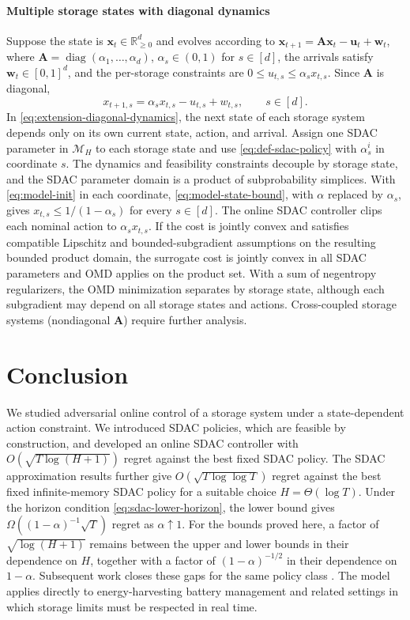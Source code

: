 \documentclass[journal]{IEEEtran}
\theoremstyle{remark}
\begin{document}
\paragraph{Multiple storage states with diagonal dynamics}
Suppose the state is $\mathbf{x}_t\in\mathbb{R}_{\ge0}^d$ and evolves according to
$\mathbf{x}_{t+1}=\mathbf{A}\mathbf{x}_t-\mathbf{u}_t+\mathbf{w}_t$, where
$\mathbf{A}=\operatorname{diag}(\alpha_1,\ldots,\alpha_d)$,
$\alpha_s\in(0,1)$ for $s\in[d]$, the arrivals satisfy
$\mathbf{w}_t\in[0,1]^d$, and the per-storage constraints are
$0\le u_{t,s}\le\alpha_s x_{t,s}$. Since $\mathbf{A}$ is diagonal,
\begin{equation}
\label{eq:extension-diagonal-dynamics}
x_{t+1,s}=\alpha_s x_{t,s}-u_{t,s}+w_{t,s},\qquad s\in[d].
\end{equation}
In \eqref{eq:extension-diagonal-dynamics}, the next state of each storage
system depends only on its own current state, action, and arrival.
Assign one SDAC parameter in $\mathcal{M}_H$ to each storage state and use
\eqref{eq:def-sdac-policy} with $\alpha_s^i$ in coordinate $s$. The dynamics
and feasibility constraints decouple by storage state, and the SDAC parameter domain
is a product of subprobability simplices. With \eqref{eq:model-init} in each
coordinate, \eqref{eq:model-state-bound}, with $\alpha$ replaced by $\alpha_s$,
gives $x_{t,s}\le1/(1-\alpha_s)$
for every $s\in[d]$. The online SDAC controller clips
each nominal action to $\alpha_s x_{t,s}$. If the cost is jointly convex and
satisfies compatible Lipschitz and bounded-subgradient assumptions on the resulting bounded product
domain, the surrogate cost is jointly convex in all SDAC parameters and OMD applies
on the product set. With a sum of negentropy regularizers, the OMD minimization
separates by storage state, although each subgradient may depend on all storage states
and actions. Cross-coupled storage systems (nondiagonal $\mathbf{A}$) require
further analysis.


\section{Conclusion}
\label{sec:conclusion}

We studied adversarial online control of a storage system under a state-dependent
action constraint. We introduced SDAC policies, which are feasible by
construction, and developed an online SDAC controller with
$O\!\left(\sqrt{T\log(H+1)}\right)$ regret against the best fixed SDAC policy.
The SDAC approximation results further give
$O\!\left(\sqrt{T\log\log T}\right)$ regret against the best fixed
infinite-memory SDAC policy for a suitable choice $H=\Theta(\log T)$.
Under the horizon condition \eqref{eq:sdac-lower-horizon}, the
lower bound gives
$\Omega((1-\alpha)^{-1}\sqrt{T})$ regret as $\alpha\uparrow1$.
For the bounds proved here, a factor of $\sqrt{\log(H+1)}$ remains between
the upper and lower bounds
in their dependence on $H$, together with a factor of $(1-\alpha)^{-1/2}$
in their dependence on $1-\alpha$. Subsequent work closes these gaps for
the same policy class \cite{asgari2026cumulative}. The model applies directly to
energy-harvesting battery management and related settings in which storage limits
must be respected in real time.
\end{document}
